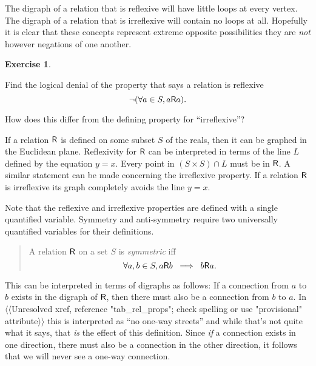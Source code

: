 \documentclass[10pt,]{book}
\theoremstyle{plain}
\theoremstyle{definition}
\theoremstyle{definition}
\newtheorem{exercise}[theorem]{Exercise}
\numberwithin{equation}{section}
\newcommand{\relR}{\mbox{\textsf R}}
\begin{document}
    The digraph of a relation that is reflexive will have little loops at every vertex.
    The digraph of a relation that is irreflexive will contain no loops at all.
    Hopefully it is clear that these concepts represent extreme opposite possibilities \textemdash{} they are \emph{not} however negations of one another.
\begin{exercise}\label{exercise-49}

        Find the logical denial of the property that says a relation is reflexive
        \begin{equation*}
          {\lnot}(\forall a \in S,  a \relR a).
        \end{equation*}
\par

        How does this differ from the defining property for ``irreflexive''?
\end{exercise}
\par

    If a relation \(\relR\) is defined on some subset \(S\) of the reals, then it can be graphed
    in the Euclidean plane. Reflexivity for \(\relR\) can be interpreted in terms of the line
    \(L\) defined by the equation \(y=x\). Every point in \((S \times S) \cap L\)
    must be in \(\relR\). A similar statement can be made concerning the irreflexive property.
    If a relation \(\relR\) is irreflexive its graph completely avoids the line \(y=x\).
\par

    Note that the reflexive and irreflexive properties are defined with a single quantified
    variable. Symmetry and anti-symmetry require two universally quantified variables for
    their definitions.
\begin{quote}
  A relation \(\relR\) on a set \(S\) is \emph{symmetric} iff
  \begin{equation*}
    \forall a,b \in S,  a \relR b \; \implies \; b \relR a.
  \end{equation*}\end{quote}
\par

    This can be interpreted in terms of digraphs as follows: If a connection
    from \(a\) to \(b\) exists in the digraph of \(\relR\), then there must also be a connection
    from \(b\) to \(a\). In {$\langle\langle$Unresolved xref, reference "tab\_rel\_props"; check spelling or use "provisional" attribute$\rangle\rangle$} this is interpreted as ``no one-way streets''
    and while that's not quite what it says, that \emph{is} the effect of this definition.
    Since \emph{if} a connection exists in one direction, there must also be a connection
    in the other direction, it follows that we will never see a one-way connection.
\par
\end{document}

